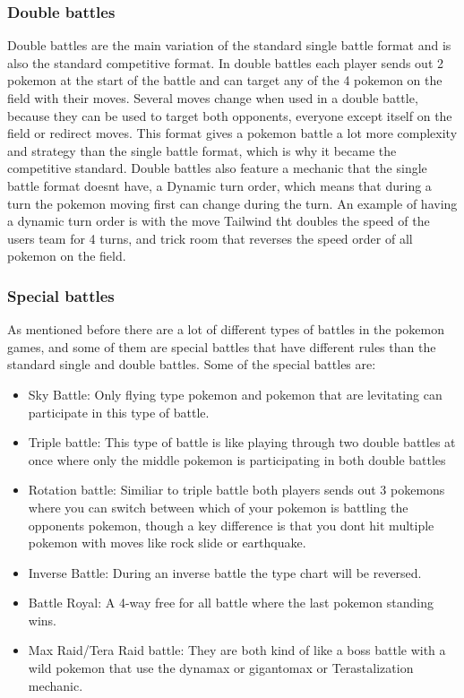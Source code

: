 \subsubsection{Double battles}
Double battles are the main variation of the standard single battle format and is also the standard competitive format. In double battles 
each player sends out 2 pokemon at the start of the battle and can target any of the 4 pokemon on the field with their moves. Several moves change 
when used in a double battle, because they can be used to target both opponents, everyone except itself on the field or redirect moves.
This format gives a pokemon battle a lot more complexity and strategy than the single battle format, which is why it became the competitive standard.
Double battles also feature a mechanic that the single battle format doesnt have, a Dynamic turn order, which means that during a turn the pokemon
moving first can change during the turn. An example of having a dynamic turn order is with the move Tailwind tht doubles the speed of the users team for 
4 turns, and trick room that reverses the speed order of all pokemon on the field. \cite{PokemonBattles}

\subsubsection{Special battles}
As mentioned before there are a lot of different types of battles in the pokemon games, and some of them are special battles that have different rules
than the standard single and double battles. Some of the special battles are: \cite{PokemonBattles}
\begin{itemize}
  \item Sky Battle: Only flying type pokemon and pokemon that are levitating can participate in this type of battle.
  \item Triple battle: This type of battle is like playing through two double battles at once where only the middle pokemon is participating 
    in both double battles
  \item Rotation battle: Similiar to triple battle both players sends out 3 pokemons where you can switch between which of your pokemon is battling
    the opponents pokemon, though a key difference is that you dont hit multiple pokemon with moves like rock slide or earthquake. 
  \item Inverse Battle: During an inverse battle the type chart will be reversed.
  \item Battle Royal: A 4-way free for all battle where the last pokemon standing wins.
  \item Max Raid/Tera Raid battle: They are both kind of like a boss battle with a wild pokemon that use the 
  dynamax or gigantomax or Terastalization mechanic.
\end{itemize}

